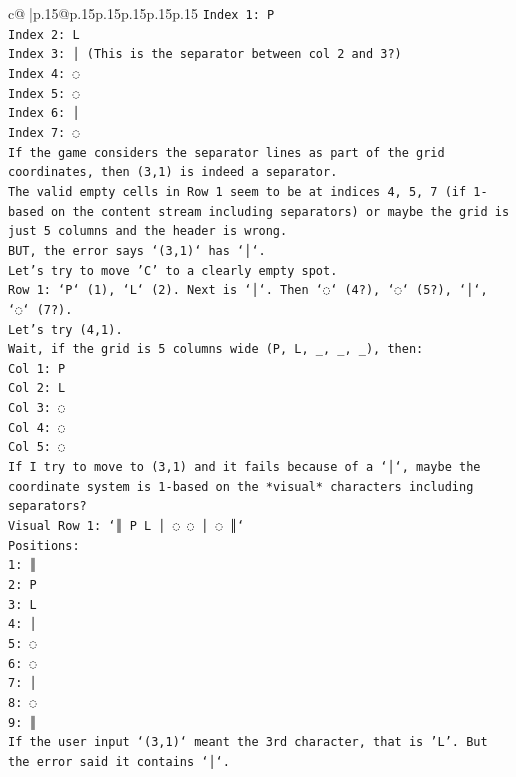\documentclass{article}
\begin{document}
{\begin{supertabular}{c@{$\;$}|p{.15\linewidth}@{}p{.15\linewidth}p{.15\linewidth}p{.15\linewidth}p{.15\linewidth}p{.15\linewidth}}
{{{\texttt{Index 1: P} \\
\texttt{Index 2: L} \\
\texttt{Index 3: │ (This is the separator between col 2 and 3?)} \\
\texttt{Index 4: ◌} \\
\texttt{Index 5: ◌} \\
\texttt{Index 6: │} \\
\texttt{Index 7: ◌} \\
\texttt{If the game considers the separator lines as part of the grid coordinates, then (3,1) is indeed a separator.} \\
\texttt{The valid empty cells in Row 1 seem to be at indices 4, 5, 7 (if 1{-}based on the content stream including separators) or maybe the grid is just 5 columns and the header is wrong.} \\
\texttt{BUT, the error says `(3,1)` has `│`.} \\
\texttt{Let's try to move 'C' to a clearly empty spot.} \\
\texttt{Row 1: `P` (1), `L` (2). Next is `│`. Then `◌` (4?), `◌` (5?), `│`, `◌` (7?).} \\
\texttt{Let's try (4,1).} \\
\texttt{Wait, if the grid is 5 columns wide (P, L, \_, \_, \_), then:} \\
\texttt{Col 1: P} \\
\texttt{Col 2: L} \\
\texttt{Col 3: ◌} \\
\texttt{Col 4: ◌} \\
\texttt{Col 5: ◌} \\
\texttt{If I try to move to (3,1) and it fails because of a `│`, maybe the coordinate system is 1{-}based on the *visual* characters including separators?} \\
\texttt{Visual Row 1: `║ P L │ ◌ ◌ │ ◌ ║`} \\
\texttt{Positions:} \\
\texttt{1: ║} \\
\texttt{2: P} \\
\texttt{3: L} \\
\texttt{4: │} \\
\texttt{5: ◌} \\
\texttt{6: ◌} \\
\texttt{7: │} \\
\texttt{8: ◌} \\
\texttt{9: ║} \\
\texttt{If the user input `(3,1)` meant the 3rd character, that is 'L'. But the error said it contains `│`.} \\
}}}
\end{supertabular}}
\end{document}
